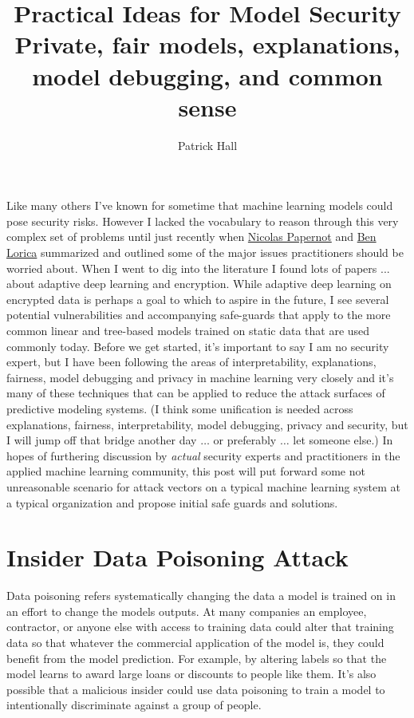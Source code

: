 \documentclass[fleqn]{article}
\title{Practical Ideas for Model Security\\
\large{Private, fair models, explanations, model debugging, and common sense}}
\author{Patrick Hall}
\begin{document}
\maketitle

Like many others I've known for sometime that machine learning models could pose security risks. However I lacked the vocabulary to reason through this very complex set of problems until just recently when \href{https://arxiv.org/pdf/1811.01134.pdf}{Nicolas Papernot} and \href{https://www.oreilly.com/ideas/you-created-a-machine-learning-application-now-make-sure-its-secure}{Ben Lorica} summarized and outlined some of the major issues practitioners should be worried about. When I went to dig into the literature I found lots of papers ... about adaptive deep learning and encryption. While adaptive deep learning on encrypted data is perhaps a goal to which to aspire in the future, I see several potential vulnerabilities and accompanying safe-guards that apply to the more common linear and tree-based models trained on static data that are used commonly today.  Before we get started, it's important to say I am no security expert, but I have been following the areas of interpretability, explanations, fairness, model debugging and privacy in machine learning very closely and it's many of these techniques that can be applied to reduce the attack surfaces of predictive modeling systems. (I think some unification is needed across explanations, fairness, interpretability, model debugging, privacy and security, but I will jump off that bridge another day $\dots$ or preferably $\dots$ let someone else.) In hopes of furthering discussion by \textit{actual} security experts and practitioners in the applied machine learning community, this post will put forward some not unreasonable scenario for attack vectors on a typical machine learning system at a typical organization and propose initial safe guards and solutions. 

\section{Insider Data Poisoning Attack} \label{sec:data_poisoning}

Data poisoning refers systematically changing the data a model is trained on in an effort to change the models outputs. At many companies an employee, contractor, or anyone else with access to training data could alter that training data so that whatever the commercial application of the model is, they could benefit from the model prediction.  For example, by altering labels so that the model learns to award large loans or discounts to people like them. It's also possible that a malicious insider could use data poisoning to train a model to intentionally discriminate against a group of people.\\
\end{document}
